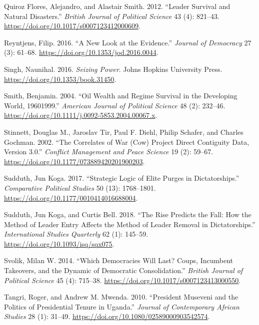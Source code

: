 \documentclass[
  12pt,
]{report}
\newlength{\cslhangindent}
\newenvironment{CSLReferences}[2] %
 {\begin{list}{}{%
  \setlength{\itemindent}{0pt}
  \setlength{\leftmargin}{0pt}
  \setlength{\parsep}{0pt}
  \ifodd #1
   \setlength{\leftmargin}{\cslhangindent}
   \setlength{\itemindent}{-1\cslhangindent}
  \fi
  \setlength{\itemsep}{#2\baselineskip}}}
 {\end{list}}
\begin{document}
\begin{CSLReferences}{1}{0}
Quiroz Flores, Alejandro, and Alastair Smith. 2012. {``Leader Survival
and Natural Disasters.''} \emph{British Journal of Political Science} 43
(4): 821--43. \url{https://doi.org/10.1017/s0007123412000609}.

Reyntjens, Filip. 2016. {``A New Look at the Evidence.''} \emph{Journal
of Democracy} 27 (3): 61--68.
\url{https://doi.org/10.1353/jod.2016.0044}.

Singh, Naunihal. 2016. \emph{Seizing Power}. Johns Hopkins University
Press. \url{https://doi.org/10.1353/book.31450}.

Smith, Benjamin. 2004. {``Oil Wealth and Regime Survival in the
Developing World, 1960{\textendash}1999.''} \emph{American Journal of
Political Science} 48 (2): 232--46.
\url{https://doi.org/10.1111/j.0092-5853.2004.00067.x}.

Stinnett, Douglas M., Jaroslav Tir, Paul F. Diehl, Philip Schafer, and
Charles Gochman. 2002. {``The Correlates of War (Cow) Project Direct
Contiguity Data, Version 3.0.''} \emph{Conflict Management and Peace
Science} 19 (2): 59--67.
\url{https://doi.org/10.1177/073889420201900203}.

Sudduth, Jun Koga. 2017. {``Strategic Logic of Elite Purges in
Dictatorships.''} \emph{Comparative Political Studies} 50 (13):
1768--1801. \url{https://doi.org/10.1177/0010414016688004}.

Sudduth, Jun Koga, and Curtis Bell. 2018. {``The Rise Predicts the Fall:
How the Method of Leader Entry Affects the Method of Leader Removal in
Dictatorships.''} \emph{International Studies Quarterly} 62 (1):
145--59. \url{https://doi.org/10.1093/isq/sqx075}.

Svolik, Milan W. 2014. {``Which Democracies Will Last? Coups, Incumbent
Takeovers, and the Dynamic of Democratic Consolidation.''} \emph{British
Journal of Political Science} 45 (4): 715--38.
\url{https://doi.org/10.1017/s0007123413000550}.

Tangri, Roger, and Andrew M. Mwenda. 2010. {``President Museveni and the
Politics of Presidential Tenure in Uganda.''} \emph{Journal of
Contemporary African Studies} 28 (1): 31--49.
\url{https://doi.org/10.1080/02589000903542574}.


\end{CSLReferences}
\end{document}

